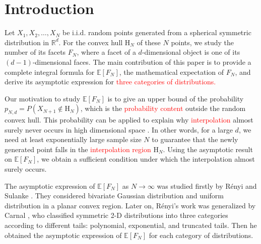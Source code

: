 \documentclass{aptpub}
\def\E{\mathbb{E}}
\begin{document}
\section{Introduction}\label{sec:intro} %


Let $X_1, X_2, \dots, X_N$ be i.i.d. random points generated from
a spherical symmetric distribution in $\mathbb{R}^d$.
For the convex hull $\mathrm{H}_N$ of these $N$ points, we study the number of its facets $F_N$,
where a facet of a $d$-dimensional object is one of its $(d-1)$-dimensional faces.
The main contribution of this paper is to provide a complete integral formula for $\E[F_N]$,
the mathematical expectation
of $F_N$, and derive its asymptotic expression
for \textcolor{red}{three categories of distributions.}

Our motivation to study $\E[F_N]$
is to give an upper bound of
the probability $p_{N,d}=P(X_{N+1} \not\in \mathrm{H}_N)$,
which is the \textcolor{red}{probability content} outside the random convex hull.
This probability can be applied to explain
why \textcolor{red}{interpolation} almost surely never occurs in high dimensional space \cite{balestriero2021learning}.
In other words, for a large $d$, we need at least exponentially large sample size $N$
to guarantee that the newly generated point falls in the \textcolor{red}{interpolation region} $\mathrm{H}_N$.
Using the asymptotic result on $\E[F_N]$, we obtain
a sufficient condition under which the interpolation almost surely occurs.


The asymptotic expression of $\E[F_N]$ as $N\to \infty$
was studied firstly by R{\'e}nyi and Sulanke \cite{renyi1963konvexe}.
They considered
bivariate Gaussian distribution and uniform distribution
in a planar convex region.
Later on,  R{\'e}nyi's work was generalized by
Carnal \cite{carnal1970konvexe}, who
classified symmetric 2-D distributions
into three categories according to different tails:
polynomial, exponential, and truncated tails.
Then he obtained the asymptotic expression of $\E[F_N]$
for each category of distributions.
\end{document}
